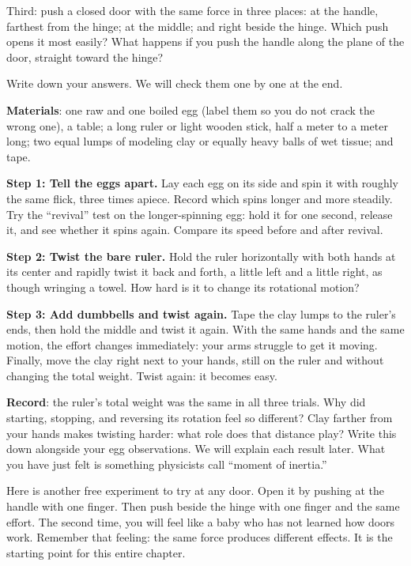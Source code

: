 Third: push a closed door with the same force in three places: at the handle, farthest from the hinge; at the middle; and right beside the hinge. Which push opens it most easily? What happens if you push the handle along the plane of the door, straight toward the hinge?

Write down your answers. We will check them one by one at the end.


\begin{experiment}
\textbf{Materials}: one raw and one boiled egg (label them so you do not crack the wrong one), a table; a long ruler or light wooden stick, half a meter to a meter long; two equal lumps of modeling clay or equally heavy balls of wet tissue; and tape.

\textbf{Step 1: Tell the eggs apart.} Lay each egg on its side and spin it with roughly the same flick, three times apiece. Record which spins longer and more steadily. Try the ``revival'' test on the longer-spinning egg: hold it for one second, release it, and see whether it spins again. Compare its speed before and after revival.

\textbf{Step 2: Twist the bare ruler.} Hold the ruler horizontally with both hands at its center and rapidly twist it back and forth, a little left and a little right, as though wringing a towel. How hard is it to change its rotational motion?

\textbf{Step 3: Add dumbbells and twist again.} Tape the clay lumps to the ruler's ends, then hold the middle and twist it again. With the same hands and the same motion, the effort changes immediately: your arms struggle to get it moving. Finally, move the clay right next to your hands, still on the ruler and without changing the total weight. Twist again: it becomes easy.

\textbf{Record}: the ruler's total weight was the same in all three trials. Why did starting, stopping, and reversing its rotation feel so different? Clay farther from your hands makes twisting harder: what role does that distance play? Write this down alongside your egg observations. We will explain each result later. What you have just felt is something physicists call ``moment of inertia.''
\end{experiment}

Here is another free experiment to try at any door. Open it by pushing at the handle with one finger. Then push beside the hinge with one finger and the same effort. The second time, you will feel like a baby who has not learned how doors work. Remember that feeling: the same force produces different effects. It is the starting point for this entire chapter.

